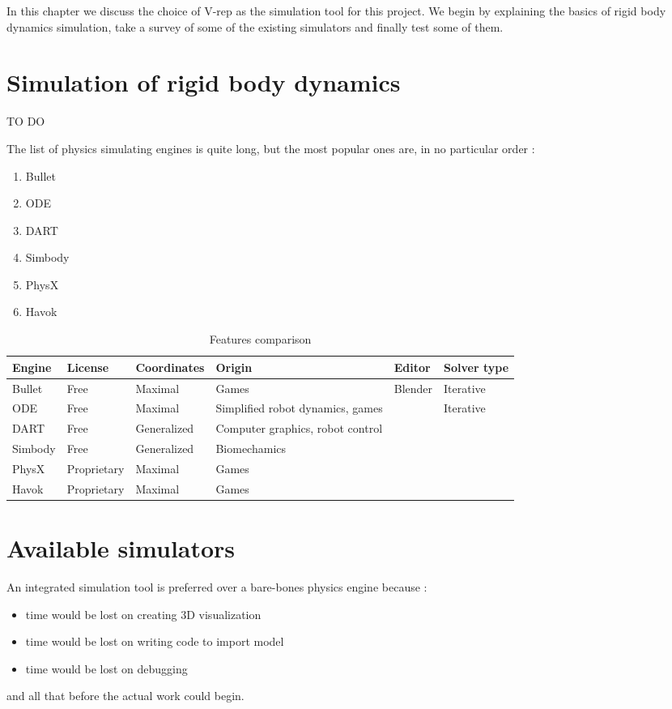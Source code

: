 In this chapter we discuss the choice of V-rep as the simulation tool for this project. We begin by explaining the basics of rigid body dynamics simulation, take a survey of some of the existing simulators and finally test some of them.

\section{Simulation of rigid body dynamics}
TO DO

The list of physics simulating engines is quite long, but the most popular ones are, in no particular order :
\begin{enumerate}
\item Bullet
\item ODE
\item DART
\item Simbody
\item PhysX
\item Havok
\end{enumerate}

\begin{table}[htp]
\center
\begin{tabularx}{\textwidth}{@{} X X X X X X @{}}
\toprule
\textbf{Engine} & \textbf{License} & \textbf{Coordinates} & \textbf{Origin} & \textbf{Editor} &\textbf{Solver type}\\ 
\midrule
Bullet & Free & Maximal & Games & Blender & Iterative \\ 

ODE & Free & Maximal & Simplified robot dynamics, games & & Iterative\\ 

DART & Free & Generalized & Computer graphics, robot control & &\\

Simbody & Free & Generalized & Biomechamics & \\

PhysX & Proprietary & Maximal & Games & \\

Havok & Proprietary & Maximal & Games & \\
\bottomrule
\end{tabularx}
\caption{Features comparison\cite{engines_comparison}}
\label{table:specs}
\end{table}

\section{Available simulators}
An integrated simulation tool is preferred over a bare-bones physics engine because :
\begin{itemize}
\item time would be lost on creating 3D visualization
\item time would be lost on writing code to import model
\item time would be lost on debugging
\end{itemize}
and all that before the actual work could begin.

